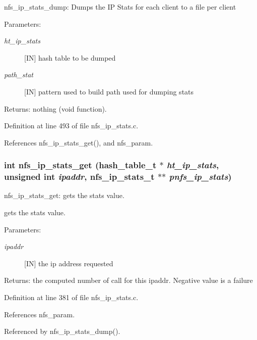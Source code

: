 nfs\_\-ip\_\-stats\_\-dump: Dumps the IP Stats for each client to a file per client

\begin{Desc}
\item[Parameters:]
\begin{description}
\item[{\em ht\_\-ip\_\-stats}][IN] hash table to be dumped \item[{\em path\_\-stat}][IN] pattern used to build path used for dumping stats\end{description}
\end{Desc}
\begin{Desc}
\item[Returns:]nothing (void function). \end{Desc}


Definition at line 493 of file nfs\_\-ip\_\-stats.c.

References nfs\_\-ip\_\-stats\_\-get(), and nfs\_\-param.
\subsubsection{\setlength{\rightskip}{0pt plus 5cm}int nfs\_\-ip\_\-stats\_\-get (hash\_\-table\_\-t $\ast$ {\em ht\_\-ip\_\-stats}, unsigned int {\em ipaddr}, nfs\_\-ip\_\-stats\_\-t $\ast$$\ast$ {\em pnfs\_\-ip\_\-stats})}\label{nfs__ip__stats_8c_a8}


nfs\_\-ip\_\-stats\_\-get: gets the stats value.

gets the stats value.

\begin{Desc}
\item[Parameters:]
\begin{description}
\item[{\em ipaddr}][IN] the ip address requested\end{description}
\end{Desc}
\begin{Desc}
\item[Returns:]the computed number of call for this ipaddr. Negative value is a failure \end{Desc}


Definition at line 381 of file nfs\_\-ip\_\-stats.c.

References nfs\_\-param.

Referenced by nfs\_\-ip\_\-stats\_\-dump().
